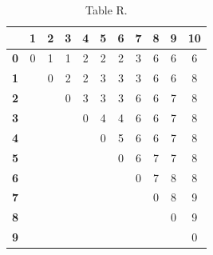 \documentclass{article}
\begin{document}
\begin{table}[!ht]
\begin{adjustwidth}{-3cm}{-3cm}
\centering
\begin{tabular}{c||c|c|c|c|c|c|c|c|c|c|}
\cline{2-11}
 & \cellcolor{gray90}\textbf{1} & \cellcolor{gray90}\textbf{2} & \cellcolor{gray90}\textbf{3} & \cellcolor{gray90}\textbf{4} & \cellcolor{gray90}\textbf{5} & \cellcolor{gray90}\textbf{6} & \cellcolor{gray90}\textbf{7} & \cellcolor{gray90}\textbf{8} & \cellcolor{gray90}\textbf{9} & \cellcolor{gray90}\textbf{10} \\
\hline\hline
\multicolumn{1}{|c||}{\cellcolor{gray90}\textbf{0}} & 0 & 1 & 1 & 2 & 2 & 2 & 3 & 6 & 6 & 6 \\ \hline
\multicolumn{1}{|c||}{\cellcolor{gray90}\textbf{1}} &  & 0 & 2 & 2 & 3 & 3 & 3 & 6 & 6 & 8 \\ \hline
\multicolumn{1}{|c||}{\cellcolor{gray90}\textbf{2}} &  &  & 0 & 3 & 3 & 3 & 6 & 6 & 7 & 8 \\ \hline
\multicolumn{1}{|c||}{\cellcolor{gray90}\textbf{3}} &  &  &  & 0 & 4 & 4 & 6 & 6 & 7 & 8 \\ \hline
\multicolumn{1}{|c||}{\cellcolor{gray90}\textbf{4}} &  &  &  &  & 0 & 5 & 6 & 6 & 7 & 8 \\ \hline
\multicolumn{1}{|c||}{\cellcolor{gray90}\textbf{5}} &  &  &  &  &  & 0 & 6 & 7 & 7 & 8 \\ \hline
\multicolumn{1}{|c||}{\cellcolor{gray90}\textbf{6}} &  &  &  &  &  &  & 0 & 7 & 8 & 8 \\ \hline
\multicolumn{1}{|c||}{\cellcolor{gray90}\textbf{7}} &  &  &  &  &  &  &  & 0 & 8 & 9 \\ \hline
\multicolumn{1}{|c||}{\cellcolor{gray90}\textbf{8}} &  &  &  &  &  &  &  &  & 0 & 9 \\ \hline
\multicolumn{1}{|c||}{\cellcolor{gray90}\textbf{9}} &  &  &  &  &  &  &  &  &  & 0 \\ \hline
\end{tabular}
\caption{Table R.}
\end{adjustwidth}
\end{table}
\end{document}
